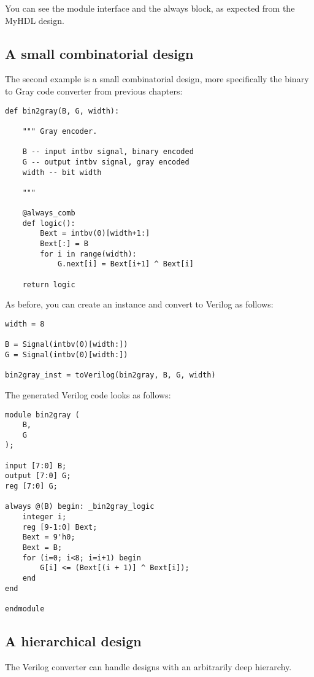 You can see the module interface and the always block, as expected
from the MyHDL design. 

\subsection{A small combinatorial design\label{conv-usage-comb}}

The second example is a small combinatorial design, more
specifically the binary to Gray code converter from previous chapters:

\begin{verbatim}
def bin2gray(B, G, width):
    
    """ Gray encoder.

    B -- input intbv signal, binary encoded
    G -- output intbv signal, gray encoded
    width -- bit width
    
    """

    @always_comb
    def logic():
        Bext = intbv(0)[width+1:]
        Bext[:] = B
        for i in range(width):
            G.next[i] = Bext[i+1] ^ Bext[i]

    return logic
\end{verbatim}

As before, you can create an instance and convert to
Verilog as follows:

\begin{verbatim}
width = 8

B = Signal(intbv(0)[width:])
G = Signal(intbv(0)[width:])

bin2gray_inst = toVerilog(bin2gray, B, G, width)
 \end{verbatim}

The generated Verilog code looks as follows:

\begin{verbatim}
module bin2gray (
    B,
    G
);

input [7:0] B;
output [7:0] G;
reg [7:0] G;

always @(B) begin: _bin2gray_logic
    integer i;
    reg [9-1:0] Bext;
    Bext = 9'h0;
    Bext = B;
    for (i=0; i<8; i=i+1) begin
        G[i] <= (Bext[(i + 1)] ^ Bext[i]);
    end
end

endmodule
\end{verbatim}

\subsection{A hierarchical design\label{conv-usage-hier}}
The Verilog converter can handle designs with an
arbitrarily deep hierarchy.

